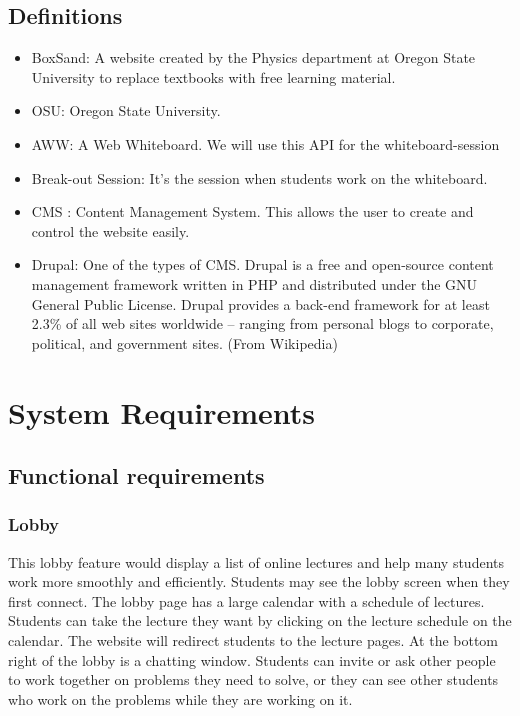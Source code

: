 \documentclass[10pt]{article}
\begin{document}
    \subsection{Definitions}
        \begin{itemize}
            \item BoxSand: A website created by the Physics department at Oregon State University to replace textbooks with free learning material.
            \item OSU: Oregon State University.
            \item AWW: A Web Whiteboard. We will use this API for the whiteboard-session
            \item Break-out Session: It’s the session when students work on the whiteboard.
            \item CMS : Content Management System. This allows the user to create and control the website easily.
            \item Drupal: One of the types of CMS. Drupal is a free and open-source content management framework written in PHP and distributed under the GNU General Public License. Drupal provides a back-end framework for at least 2.3\% of all web sites worldwide – ranging from personal blogs to corporate, political, and government sites. (From Wikipedia)
        \end{itemize}
        
\section{System Requirements}
    \subsection{Functional requirements}
        \subsubsection{Lobby}
            This lobby feature would display a list of online lectures and help many students work more smoothly and efficiently. Students may see the lobby screen when they first connect. The lobby page has a large calendar with a schedule of lectures. Students can take the lecture they want by clicking on the lecture schedule on the calendar. The website will redirect students to the lecture pages. At the bottom right of the lobby is a chatting window. Students can invite or ask other people to work together on problems they need to solve, or they can see other students who work on the problems while they are working on it.
            
\end{document}
